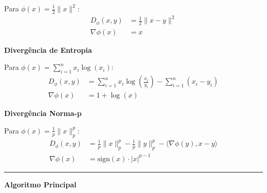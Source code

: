 \documentclass[12pt,a4paper]{article}
\begin{document}
Para $\phi(x) = \frac{1}{2}\|x\|^2$:
\begin{align}
D_{\phi}(x, y) &= \frac{1}{2}\|x - y\|^2 \\
\nabla \phi(x) &= x
\end{align}

\textbf{Divergência de Entropia}

Para $\phi(x) = \sum_{i=1}^n x_i \log(x_i)$:
\begin{align}
D_{\phi}(x, y) &= \sum_{i=1}^n x_i \log\left(\frac{x_i}{y_i}\right) - \sum_{i=1}^n (x_i - y_i) \\
\nabla \phi(x) &= 1 + \log(x)
\end{align}

\textbf{Divergência Norma-p}

Para $\phi(x) = \frac{1}{p}\|x\|_p^p$:
\begin{align}
D_{\phi}(x, y) &= \frac{1}{p}\|x\|_p^p - \frac{1}{p}\|y\|_p^p - \langle \nabla \phi(y), x - y \rangle \\
\nabla \phi(x) &= \text{sign}(x) \cdot |x|^{p-1}
\end{align}

\vspace{0.5cm}\hrule\vspace{0.5cm}\textbf{Algoritmo Principal}
\end{document}

